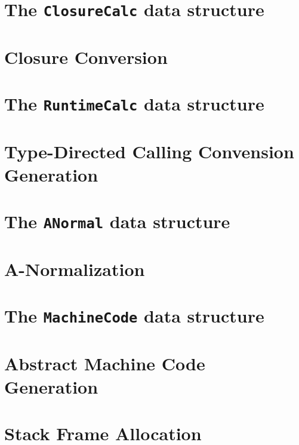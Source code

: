 \documentclass{jbook}
\newcommand{\txt}[2]{#2}
\newcommand{\code}[1]{\mbox{\large\tt #1}}
\begin{document}
\chapter{\txt
{\code{ClosureCalc}データ構造}
{The \code{ClosureCalc} data structure}
}
\label{chap:ClosureCalc}

\chapter{\txt
{クロージャー変換}
{Closure Conversion}
}
\label{chap:closureconversion}

\chapter{\txt
{\code{RuntimeCalc}データ構造}
{The \code{RuntimeCalc} data structure}
}
\label{chap:RuntimeCalc}

\chapter{\txt
{型主導のコーリングコンベンション生成}
{Type-Directed Calling Convension Generation}
}
\label{chap:callingconventiongeneration}

\chapter{\txt
{\code{ANornal}データ構造}
{The \code{ANormal} data structure}
}
\label{chap:ANormal}

\chapter{\txt
{A正規化処理}
{A-Normalization}
}
\label{chap:anormalization}

\chapter{\txt
{\code{MachineCode}データ構造}
{The \code{MachineCode} data structure}
}
\label{chap:MachineCode}

\chapter{\txt
{抽象機械語生成}
{Abstract Machine Code Generation}
}
\label{chap:abstractcodegeneratrion}

\chapter{\txt
{フレームスタック割り当て}
{Stack Frame Allocation}
}
\label{chap:stackframeallocation}
\end{document}
